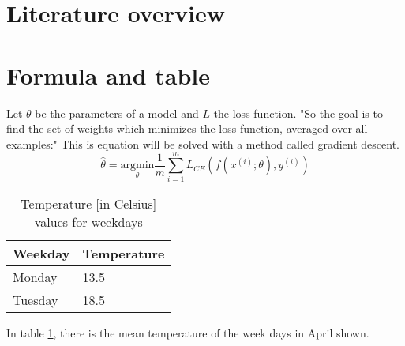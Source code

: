 \documentclass{article}
\begin{document}
\section{Literature overview}

\section{Formula and table}
Let $\theta$ be the parameters of a model and $L$ the loss function. "So the goal is to find the set of weights which minimizes the loss function, averaged over all examples:"\cite[p.~83]{jurafskySpeechLanguageProcessing2014} This is equation will be solved with a method called gradient descent.
\begin{equation}
	\hat{\theta} = \underset{\theta}{\mathrm{argmin}} \frac{1}{m} \sum_{i=1}^{m}L_{CE}(f(x^{(i)}; \theta),y^{(i)})
	\label{eq:gradient-descent}
\end{equation}


\begin{table}[ht]
	\centering
	\begin{tabular}{@{}ll@{}}
		\toprule
		Weekday & Temperature \\
		\midrule
		Monday & 13.5 \\
		Tuesday & 18.5 \\ \bottomrule
	\end{tabular}
	\caption{Temperature [in Celsius] values for weekdays}
	\label{tab:my-table1}
\end{table}

In table \ref{tab:my-table1}, there is the mean temperature of the week days in April shown. 

\newpage

\end{document}
